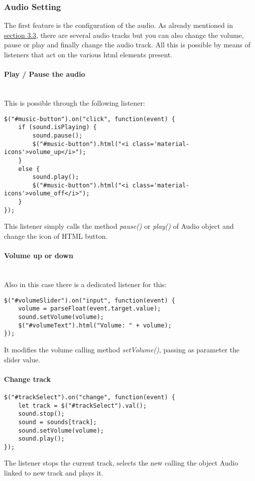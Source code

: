 \documentclass{article}
\begin{document}
\subsubsection{Audio Setting}
The first feature is the configuration of the audio. As already mentioned in \hyperref[music:section]{section 3.3}, there are several audio tracks but you can also change the volume, pause or play and finally change the audio track. All this is possible by means of listeners that act on the various html elements present.
\paragraph{Play / Pause the audio} \mbox{}\\
This is possible through the following listener:
\begin{lstlisting}
$("#music-button").on("click", function(event) {
	if (sound.isPlaying) {
		sound.pause();
		$("#music-button").html("<i class='material-icons'>volume_up</i>");
	}
	else {
		sound.play();
		$("#music-button").html("<i class='material-icons'>volume_off</i>");
	}
});
\end{lstlisting}
This listener simply calls the method \textit{pause()} or \textit{play()} of Audio object and change the icon of HTML button.
\paragraph{Volume up or down} \mbox{}\\
Also in this case there is a dedicated listener for this:
\begin{lstlisting}
$("#volumeSlider").on("input", function(event) {
	volume = parseFloat(event.target.value);
	sound.setVolume(volume);
	$("#volumeText").html("Volume: " + volume);
});
\end{lstlisting}
It modifies the volume calling method \textit{setVolume()}, passing as parameter the slider value.
\paragraph{Change track} \mbox{}
\begin{lstlisting}
$("#trackSelect").on("change", function(event) {
	let track = $("#trackSelect").val();
	sound.stop();
	sound = sounds[track];
	sound.setVolume(volume);
	sound.play();
});
\end{lstlisting}
The listener stops the current track, selects the new calling the object Audio linked to new track and plays it. 
\end{document}
